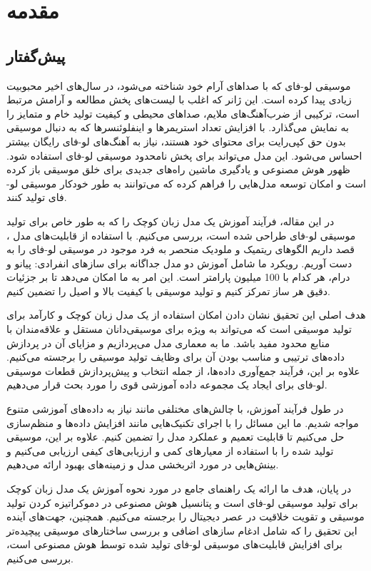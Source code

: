\chapter{مقدمه}
\section{پیش‌گفتار}
موسیقی لو-فای که با صداهای آرام خود شناخته می‌شود، در سال‌های اخیر محبوبیت زیادی پیدا کرده است. این ژانر که اغلب با لیست‌های پخش مطالعه و آرامش مرتبط است، ترکیبی از ضرب‌آهنگ‌های ملایم، صداهای محیطی و کیفیت تولید خام و متمایز را به نمایش می‌گذارد. با افزایش تعداد استریمرها و اینفلوئنسرها که به دنبال موسیقی بدون حق کپی‌رایت برای محتوای خود هستند، نیاز به آهنگ‌های لو-فای رایگان بیشتر احساس می‌شود. این مدل می‌تواند برای پخش نامحدود موسیقی لو-فای استفاده شود. ظهور هوش مصنوعی  و یادگیری ماشین  راه‌های جدیدی برای خلق موسیقی باز کرده است و امکان توسعه مدل‌هایی را فراهم کرده که می‌توانند به طور خودکار موسیقی لو-فای تولید کنند.

در این مقاله، فرآیند آموزش یک مدل زبان کوچک را که به طور خاص برای تولید موسیقی لو-فای طراحی شده است، بررسی می‌کنیم. با استفاده از قابلیت‌های مدل ، قصد داریم الگوهای ریتمیک و ملودیک منحصر به فرد موجود در موسیقی لو-فای را به دست آوریم. رویکرد ما شامل آموزش دو مدل جداگانه برای سازهای انفرادی: پیانو و درام، هر کدام با 100 میلیون پارامتر است. این امر به ما امکان می‌دهد تا بر جزئیات دقیق هر ساز تمرکز کنیم و تولید موسیقی با کیفیت بالا و اصیل را تضمین کنیم.

هدف اصلی این تحقیق نشان دادن امکان استفاده از یک مدل زبان کوچک و کارآمد برای تولید موسیقی است که می‌تواند به ویژه برای موسیقی‌دانان مستقل و علاقه‌مندان با منابع محدود مفید باشد. ما به معماری مدل  می‌پردازیم و مزایای آن در پردازش داده‌های ترتیبی و مناسب بودن آن برای وظایف تولید موسیقی را برجسته می‌کنیم. علاوه بر این، فرآیند جمع‌آوری داده‌ها، از جمله انتخاب و پیش‌پردازش قطعات موسیقی لو-فای برای ایجاد یک مجموعه داده آموزشی قوی را مورد بحث قرار می‌دهیم.

در طول فرآیند آموزش، با چالش‌های مختلفی مانند نیاز به داده‌های آموزشی متنوع مواجه شدیم. ما این مسائل را با اجرای تکنیک‌هایی مانند افزایش داده‌ها و منظم‌سازی حل می‌کنیم تا قابلیت تعمیم و عملکرد مدل را تضمین کنیم. علاوه بر این، موسیقی تولید شده را با استفاده از معیارهای کمی و ارزیابی‌های کیفی ارزیابی می‌کنیم و بینش‌هایی در مورد اثربخشی مدل و زمینه‌های بهبود ارائه می‌دهیم.

در پایان، هدف ما ارائه یک راهنمای جامع در مورد نحوه آموزش یک مدل زبان کوچک برای تولید موسیقی لو-فای است و پتانسیل هوش مصنوعی در دموکراتیزه کردن تولید موسیقی و تقویت خلاقیت در عصر دیجیتال را برجسته می‌کنیم. همچنین، جهت‌های آینده این تحقیق را که شامل ادغام سازهای اضافی و بررسی ساختارهای موسیقی پیچیده‌تر برای افزایش قابلیت‌های موسیقی لو-فای تولید شده توسط هوش مصنوعی است، بررسی می‌کنیم.